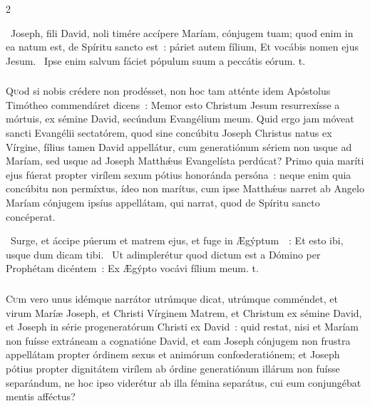 \documentclass[9pt,twoside]{extarticle}
\begin{document}
\begin{multicols}{2}
{{\begin{tightlist}{}
\item {}~Joseph, fili David, noli timére accípere Maríam, cónjugem tuam; quod enim in ea natum est, de Spíritu sancto est~: páriet autem fílium, \textred{*} Et vocábis nomen ejus Jesum. ~Ipse enim salvum fáciet pópulum suum a peccátis eórum. t.
\end{tightlist}

\subsubsection*{\center {}}
\lettrine{Q}uod si nobis crédere non prodésset, non hoc tam atténte idem Apóstolus Timótheo commendáret dicens~: Memor esto Christum Jesum resurrexísse a mórtuis, ex sémine David, secúndum Evangélium meum. Quid ergo jam móveat sancti Evangélii sectatórem, quod sine concúbitu Joseph Christus natus ex Vírgine, fílius tamen David appellátur, cum generatiónum sériem non usque ad Maríam, sed usque ad Joseph Matthǽus Evangelísta perdúcat? Primo quia maríti ejus fúerat propter virílem sexum pótius honoránda persóna~: neque enim quia concúbitu non permíxtus, ídeo non marítus, cum ipse Matthǽus narret ab Angelo Maríam cónjugem ipsíus appellátam, qui narrat, quod de Spíritu sancto concéperat.

\begin{tightlist}{}
\item {}~Surge, et áccipe púerum et matrem ejus, et fuge in Ægýptum~~: \textred{*} Et esto ibi, usque dum dicam tibi. ~Ut adimplerétur quod dictum est a Dómino per Prophétam dicéntem~: Ex Ægýpto vocávi fílium meum. t.
\end{tightlist}

\subsubsection*{\center {}}
\lettrine{C}um vero unus idémque narrátor utrúmque dicat, utrúmque comméndet, et virum Maríæ Joseph, et Christi Vírginem Matrem, et Christum ex sémine David, et Joseph in série progeneratórum Christi ex David~: quid restat, nisi et Maríam non fuísse extráneam a cognatióne David, et eam Joseph cónjugem non frustra appellátam propter órdinem sexus et animórum confœderatiónem; et Joseph pótius propter dignitátem virílem ab órdine generatiónum illárum non fuísse separándum, ne hoc ipso viderétur ab illa fémina separátus, cui eum conjungébat mentis afféctus?

}}
\end{multicols}
\end{document}
